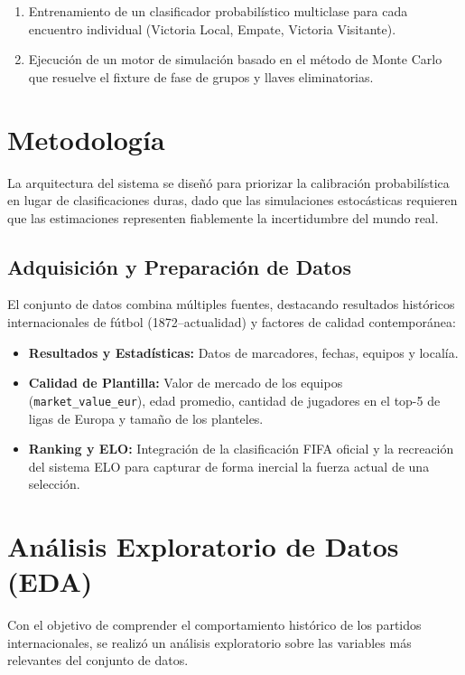 \documentclass[conference]{IEEEtran}
\begin{document}
	\begin{enumerate}
		\item Entrenamiento de un clasificador probabilístico multiclase para cada encuentro individual (Victoria Local, Empate, Victoria Visitante).
		\item Ejecución de un motor de simulación basado en el método de Monte Carlo que resuelve el fixture de fase de grupos y llaves eliminatorias.
	\end{enumerate}
	
	\section{Metodología}
	
	La arquitectura del sistema se diseñó para priorizar la calibración probabilística en lugar de clasificaciones duras, dado que las simulaciones estocásticas requieren que las estimaciones representen fiablemente la incertidumbre del mundo real.
	
	\subsection{Adquisición y Preparación de Datos}
	
	El conjunto de datos combina múltiples fuentes, destacando resultados históricos internacionales de fútbol (1872--actualidad) y factores de calidad contemporánea:
	
	\begin{itemize}
		\item \textbf{Resultados y Estadísticas:} Datos de marcadores, fechas, equipos y localía.
		
		\item \textbf{Calidad de Plantilla:} Valor de mercado de los equipos (\texttt{market\_value\_eur}), edad promedio, cantidad de jugadores en el top-5 de ligas de Europa y tamaño de los planteles.
		
		\item \textbf{Ranking y ELO:} Integración de la clasificación FIFA oficial y la recreación del sistema ELO para capturar de forma inercial la fuerza actual de una selección.
	\end{itemize}
	\section{Análisis Exploratorio de Datos (EDA)}
	
	Con el objetivo de comprender el comportamiento histórico de los partidos internacionales, se realizó un análisis exploratorio sobre las variables más relevantes del conjunto de datos.
	
\end{document}
